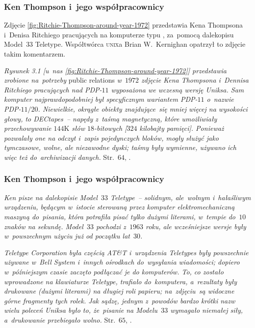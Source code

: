 \documentclass[10pt,t]{beamer}
\begin{document}
\begin{frame}
  \frametitle{Ken Thompson i~jego współpracownicy}


  Zdjęcie \eqref{fig:Ritchie-Thompson-around-year-1972} przedstawia Kena
  Thompsona i~Denisa Ritchiego pracujących na komputerze typu
  , za~pomocą
  dalekopisu
  {Model~$33$ Teletype}. Współtwórca \textsc{unix}a Brian
  W.~Kernighan opatrzył to zdjęcie takim komentarzem.

  \textit{Rysunek 3.1 [u~nas \eqref{fig:Ritchie-Thompson-around-year-1972}]
    przedstawia zrobione na~potrzeby} public relations \textit{w~$1972$
    zdjęcie Kena Thompsona i~Dennisa Ritchiego pracujących nad PDP-$11$
    wyposażona we wczesną wersję Uniksa. Sam komputer najprawdopodobniej
    był specyficznym wariantem PDP-$11$ o~nazwie PDP-$11/20$. Niewielkie,
    okrągłe obiekty znajdujące~się mniej więcej na wysokości głowy, to
    DECtapes~-- napędy z~taśmą magnetyczną, które umożliwiały przechowywanie
    $144\text{K}$ słów $18$-bitowych [$324$ kilobajty pamięci]. Ponieważ
    pozwalały one na odczyt i~zapis pojedynczych bloków, mogły służyć jako
    tymczasowe, wolne, ale niezawodne dyski; taśmy były wymienne, używano
    ich więc też do~archiwizacji danych.}
  Str.~$64$, \parencite{Kernighan-Jak-Unix-tworzyl-historie-Pub-2021}.

\end{frame}





\begin{frame}
  \frametitle{Ken Thompson i~jego współpracownicy}


  \textit{Ken pisze na dalekopisie Model~$33$ Teletype~-- solidnym,
    ale~wolnym i~hałaśliwym urządzeniu, będącym w~istocie sterowaną przez
    komputer elektromechaniczną maszyną do~pisania, która potrafiła pisać
    tylko dużymi literami, w~tempie do~$10$ znaków na sekundę. Model~$33$
    pochodzi z~$1963$ roku, ale wcześniejsze wersje były w~powszechnym
    użyciu już od początku lat~$30$.}

  \textit{Teletype Corporation była częścią AT\&T i~urządzenia Teletypes
    były powszechnie używane w~Bell System i~innych ośrodkach
    do~wysyłania wiadomości; dopiero w~późniejszym czasie zaczęto
    podłączać je do komputerów. To, co zostało wprowadzone na klawiaturze
    Teletype, trafiało do~komputera, a~rezultaty były drukowane (dużymi
    literami) na długiej roli papieru; na~zdjęciu~są widoczne górne
    fragmenty tych rolek. Jak sądzę, jednym z~powodów bardzo krótki
    nazw wielu poleceń Uniksa było to, że~pisanie na Modelu~$33$ wymagało
    niemałej siły, a~drukowanie przebiegało wolno.}
  Str.~$65$, \parencite{Kernighan-Jak-Unix-tworzyl-historie-Pub-2021}.

\end{frame}
\end{document}
